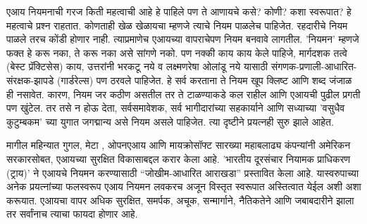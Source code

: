 एआय नियमनाची गरज किती महत्वाची आहे हे पाहिले पण ते आणायचे कसे? कोणी? कशा स्वरूपात? हे महत्वाचे प्रश्न राहतात. कोणताही खेळ खेळायचा म्हणजे त्याचे नियम पाळलेच पाहिजेत. रहदारीचे नियम पाळले तरच कोंडी होणार नाही. त्याप्रमाणेच एआयच्या वापराचेपण नियम बनवावे लागतील. 'नियमन' म्हणजे फक्त हे करू नका, ते करू नका असे सांगणे नको. पण नक्की काय काय केले पाहिजे, मार्गदशक तत्वे (बेस्ट प्रॅक्टिसेस) काय, उत्तरांनी भरकटू नये व लक्ष्मणरेषा ओलांडू नये यासाठी संगणक-प्रणाली-आधारित-संरक्षक-झापडे (गार्डरेल्स) पण ठरवले पाहिजेत. हे सर्व करताना ते नियम खूप क्लिष्ट आणि शब्द जंजाळ ही नसावेत. कारण, नियम जर कठीण असतील तर ते टाळण्याकडे कल राहील आणि एआयची पुढील प्रगती पण खुंटेल. तर तसे न होऊ देता, सर्वसमावेशक, सर्व भागीदारांच्या सहकार्याने आणि सध्याच्या 'वसुधैव कुटुम्बकम' च्या युगात जगद्मान्य असे नियम असले पाहिजेत. त्या दृष्टीने प्रयत्नही सुरु झाले आहेत.

मागील महिन्यात गुगल, मेटा , ओपनएआय आणि मायक्रोसॉफ्ट सारख्या महाबलाढ्य कंपन्यांनी अमेरिकन सरकारसोबत, एआयच्या सुरक्षित विकासाबद्दल करार केला आहे. 'भारतीय दूरसंचार नियामक प्राधिकरण (ट्राय)' ने एआयचे नियमन करण्यासाठी ``जोखीम-आधारित आराखडा'' प्रस्तावित केला आहे. यास्वरुपाच्या अनेक प्रयत्नांच्या फलस्वरूप एआय नियमन लवकरच अजून विस्तृत स्वरूपात अस्तित्वात येईल अशी अशा करूयात. एआयचा वापर अधिक सुरक्षित, समर्पक, अचूक, सन्मार्गाने, नैतिकतेने आणि जबाबदारीने झाला तर सर्वांनाच त्याचा फायदा होणार आहे.